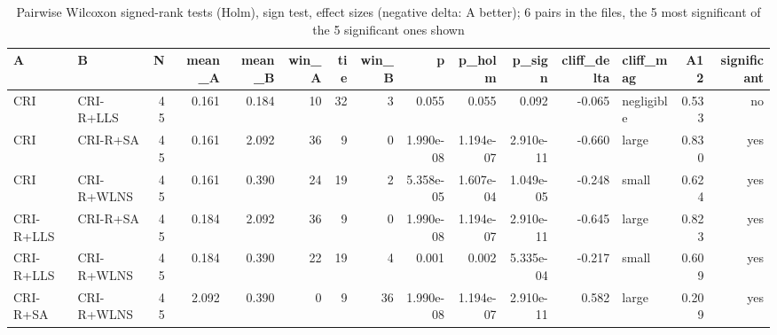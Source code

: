 \begin{table}[htbp]
\centering
\small
\caption{Pairwise Wilcoxon signed-rank tests (Holm), sign test, effect sizes (negative delta: A better); 6 pairs in the files, the 5 most significant of the 5 significant ones shown}
\label{tab:E5b_ablation_60s_b60_pairwise}
\begin{tabular}{llrrrrrrrrrrlrr}
\toprule
A & B & N & mean\_A & mean\_B & win\_A & tie & win\_B & p & p\_holm & p\_sign & cliff\_delta & cliff\_mag & A12 & significant \\
\midrule
CRI & CRI-R+LLS & 45 & 0.161 & 0.184 & 10 & 32 & 3 & 0.055 & 0.055 & 0.092 & -0.065 & negligible & 0.533 & no \\
CRI & CRI-R+SA & 45 & 0.161 & 2.092 & 36 & 9 & 0 & 1.990e-08 & 1.194e-07 & 2.910e-11 & -0.660 & large & 0.830 & yes \\
CRI & CRI-R+WLNS & 45 & 0.161 & 0.390 & 24 & 19 & 2 & 5.358e-05 & 1.607e-04 & 1.049e-05 & -0.248 & small & 0.624 & yes \\
CRI-R+LLS & CRI-R+SA & 45 & 0.184 & 2.092 & 36 & 9 & 0 & 1.990e-08 & 1.194e-07 & 2.910e-11 & -0.645 & large & 0.823 & yes \\
CRI-R+LLS & CRI-R+WLNS & 45 & 0.184 & 0.390 & 22 & 19 & 4 & 0.001 & 0.002 & 5.335e-04 & -0.217 & small & 0.609 & yes \\
CRI-R+SA & CRI-R+WLNS & 45 & 2.092 & 0.390 & 0 & 9 & 36 & 1.990e-08 & 1.194e-07 & 2.910e-11 & 0.582 & large & 0.209 & yes \\
\bottomrule
\end{tabular}
\end{table}
